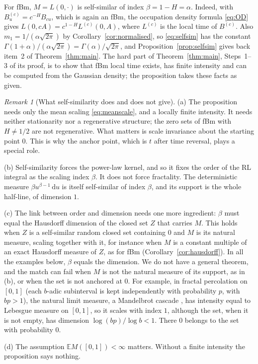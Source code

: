 \documentclass[11pt]{article}
\theoremstyle{remark}
\newtheorem{remark}[theorem]{Remark}
\theoremstyle{definition}
\newcommand{\E}{\mathbb{E}}
\newcommand{\dd}{\,\mathrm{d}}
\begin{document}
For fBm, $M=L(0,\cdot)$ is self-similar of index $\beta=1-H=\alpha$. Indeed, with $B^{(c)}_u=c^{-H}B_{cu}$, which is again an fBm, the occupation density formula \eqref{eq:OD} gives $L(0,cA)=c^{1-H}L^{(c)}(0,A)$, where $L^{(c)}$ is the local time of $B^{(c)}$. Also $m_1=1/(\alpha\sqrt{2\pi})$ by Corollary~\ref{cor:normalised}, so \eqref{eq:selfsim} has the constant $\Gamma(1+\alpha)/(\alpha\sqrt{2\pi})=\Gamma(\alpha)/\sqrt{2\pi}$, and Proposition~\ref{prop:selfsim} gives back item~2 of Theorem~\ref{thm:main}. The hard part of Theorem~\ref{thm:main}, Steps~1--3 of its proof, is to show that fBm local time exists, has finite intensity and can be computed from the Gaussian density; the proposition takes these facts as given.

\begin{remark}[What self-similarity does and does not give]\label{rem:selfsim}
(a) The proposition needs only the mean scaling \eqref{eq:meanscale}, and a locally finite intensity. It needs neither stationarity nor a regenerative structure; the zero sets of fBm with $H\neq1/2$ are not regenerative. What matters is scale invariance about the starting point $0$. This is why the anchor point, which is $t$ after time reversal, plays a special role.

(b) Self-similarity forces the power-law kernel, and so it fixes the order of the RL integral as the scaling index $\beta$. It does not force fractality. The deterministic measure $\beta u^{\beta-1}\dd u$ is itself self-similar of index $\beta$, and its support is the whole half-line, of dimension $1$.

(c) The link between order and dimension needs one more ingredient: $\beta$ must equal the Hausdorff dimension of the closed set $Z$ that carries $M$. This holds when $Z$ is a self-similar random closed set containing $0$ and $M$ is its natural measure, scaling together with it, for instance when $M$ is a constant multiple of an exact Hausdorff measure of $Z$, as for fBm (Corollary~\ref{cor:hausdorff}). In all the examples below, $\beta$ equals the dimension. We do not have a general theorem, and the match can fail when $M$ is not the natural measure of its support, as in (b), or when the set is not anchored at $0$. For example, in fractal percolation on $[0,1]$ (each $b$-adic subinterval is kept independently with probability $p$, with $bp>1$), the natural limit measure, a Mandelbrot cascade \cite{KP76}, has intensity equal to Lebesgue measure on $[0,1]$, so it scales with index $1$, although the set, when it is not empty, has dimension $\log(bp)/\log b<1$. There $0$ belongs to the set with probability $0$.

(d) The assumption $\E M([0,1])<\infty$ matters. Without a finite intensity the proposition says nothing.
\end{remark}
\end{document}
